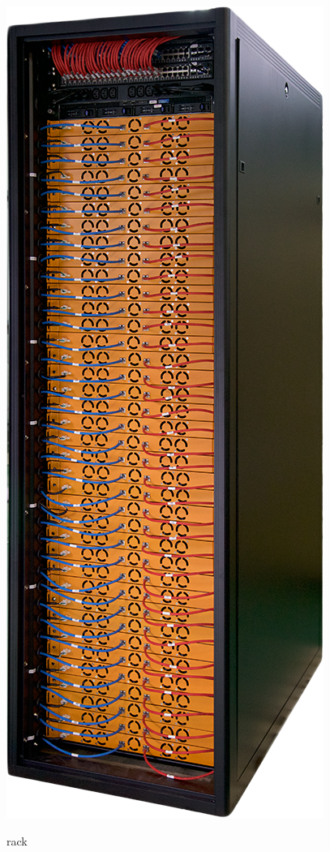 \begin{figure}[htbp]
\centering
\includegraphics[scale=0.30]{img/rack.png}\\
\caption{rack \label{figura1.12}}
\end{figure}

